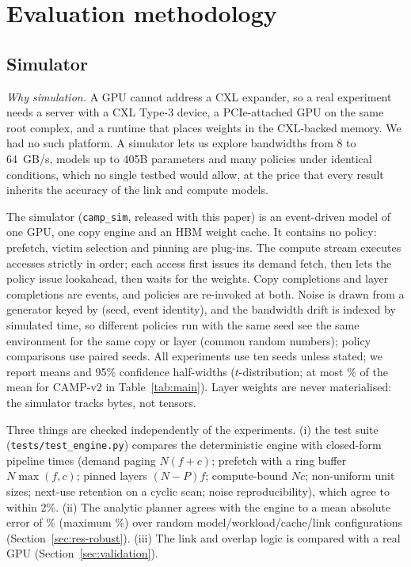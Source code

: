 \documentclass[preprint,12pt]{elsarticle}
\newcommand{\camp}{\textsc{CAMP}}
\begin{document}
\section{Evaluation methodology}
\label{sec:method}

\subsection{Simulator}
\label{sec:sim}

\emph{Why simulation.} A GPU cannot address a CXL expander, so a real experiment needs a server with a CXL Type-3 device, a PCIe-attached GPU on the same root complex, and a runtime that places weights in the CXL-backed memory. We had no such platform. A simulator lets us explore bandwidths from 8 to 64~GB/s, models up to 405B parameters and many policies under identical conditions, which no single testbed would allow, at the price that every result inherits the accuracy of the link and compute models.

The simulator (\texttt{camp\_sim}, released with this paper) is an event-driven model of one GPU, one copy engine and an HBM weight cache. It contains no policy: prefetch, victim selection and pinning are plug-ins. The compute stream executes accesses strictly in order; each access first issues its demand fetch, then lets the policy issue lookahead, then waits for the weights. Copy completions and layer completions are events, and policies are re-invoked at both. Noise is drawn from a generator keyed by (seed, event identity), and the bandwidth drift is indexed by simulated time, so different policies run with the same seed see the same environment for the same copy or layer (common random numbers); policy comparisons use paired seeds. All experiments use ten seeds unless stated; we report means and 95\% confidence half-widths ($t$-distribution; at most \nCiMaxPct\% of the mean for \camp-v2 in Table~\ref{tab:main}). Layer weights are never materialised: the simulator tracks bytes, not tensors.

Three things are checked independently of the experiments. (i) the test suite (\texttt{tests/test\_engine.py}) compares the deterministic engine with closed-form pipeline times (demand paging $N(f+c)$; prefetch with a ring buffer $N\max(f,c)$; pinned layers $(N-P)f$; compute-bound $Nc$; non-uniform unit sizes; next-use retention on a cyclic scan; noise reproducibility), which agree to within 2\%. (ii) The analytic planner agrees with the engine to a mean absolute error of \nPlannerMape\% (maximum \nPlannerMax\%) over \nPlannerCount{} random model/workload/cache/link configurations (Section~\ref{sec:res-robust}). (iii) The link and overlap logic is compared with a real GPU (Section~\ref{sec:validation}).
\end{document}
